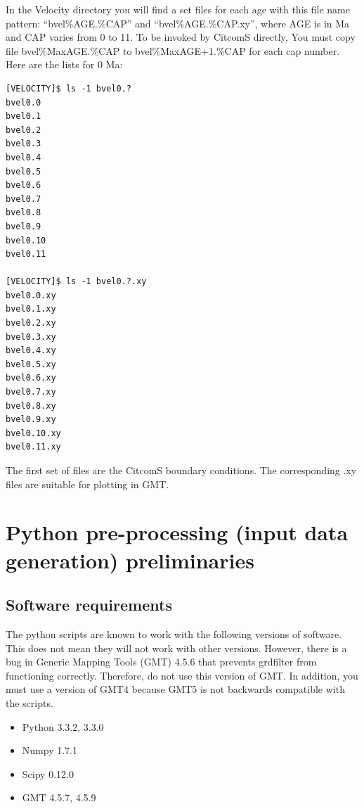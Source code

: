 \documentclass[letterpaper,12pt]{article}
\begin{document}
In the Velocity directory you will find a set files for each age with this file name pattern:
``bvel\%AGE.\%CAP'' and ``bvel\%AGE.\%CAP.xy'', where AGE is in Ma and CAP varies from 0 to 11.
To be invoked by CitcomS directly, You must copy file bvel\%MaxAGE.\%CAP to bvel\%{MaxAGE+1}.\%CAP for each cap number.
Here are the lists for 0 Ma:

\begin{verbatim}
[VELOCITY]$ ls -1 bvel0.?
bvel0.0
bvel0.1
bvel0.2
bvel0.3
bvel0.4
bvel0.5
bvel0.6
bvel0.7
bvel0.8
bvel0.9
bvel0.10
bvel0.11

[VELOCITY]$ ls -1 bvel0.?.xy
bvel0.0.xy
bvel0.1.xy
bvel0.2.xy
bvel0.3.xy
bvel0.4.xy
bvel0.5.xy
bvel0.6.xy
bvel0.7.xy
bvel0.8.xy
bvel0.9.xy
bvel0.10.xy
bvel0.11.xy
\end{verbatim}

The first set of files are the CitcomS boundary conditions.  
The corresponding .xy files are suitable for plotting in GMT.



\section{Python pre-processing (input data generation) preliminaries}
\subsection{Software requirements}
The python scripts are known to work with the following versions of software.  This does not mean they will not work with other versions.  However, there is a bug in Generic Mapping Tools (GMT) 4.5.6 that prevents grdfilter from functioning correctly.  Therefore, do not use this version of GMT.  In addition, you must use a version of GMT4 because GMT5 is not backwards compatible with the scripts.
\begin{itemize}
\item Python 3.3.2, 3.3.0
\item Numpy 1.7.1
\item Scipy 0.12.0
\item GMT 4.5.7, 4.5.9
\end{itemize}
\end{document}
